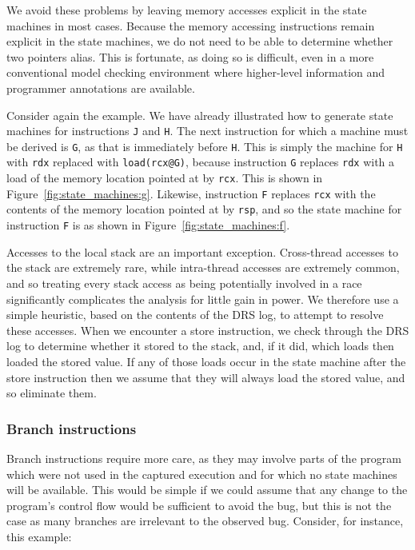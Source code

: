 \documentclass[10pt,letter,twocolumn]{sigplanconf}
\newcommand{\editorial}[1]{}
\newcommand{\needCite}{\editorial{need cite}}
\begin{document}
We avoid these problems by leaving memory accesses explicit in the
state machines in most cases.  Because the memory accessing
instructions remain explicit in the state machines, we do not need to
be able to determine whether two pointers alias.  This is fortunate,
as doing so is difficult, even in a more conventional model checking
environment where higher-level information and programmer annotations
are available\needCite{}.

Consider again the example.  We have already illustrated how to
generate state machines for instructions \verb|J| and \verb|H|.  The
next instruction for which a machine must be derived is \verb|G|, as
that is immediately before \verb|H|.  This is simply the machine for
\verb|H| with \verb|rdx| replaced with \verb|load(rcx@G)|, because
instruction \verb|G| replaces \verb|rdx| with a load of the memory
location pointed at by \verb|rcx|.  This is shown in
Figure~\ref{fig:state_machines:g}.  Likewise, instruction \verb|F|
replaces \verb|rcx| with the contents of the memory location pointed
at by \verb|rsp|, and so the state machine for instruction \verb|F| is
as shown in Figure~\ref{fig:state_machines:f}.

Accesses to the local stack are an important exception.  Cross-thread
accesses to the stack are extremely rare, while intra-thread accesses
are extremely common, and so treating every stack access as being
potentially involved in a race significantly complicates the analysis
for little gain in power.  We therefore use a simple heuristic, based
on the contents of the DRS log, to attempt to resolve these accesses.
When we encounter a store instruction, we check through the DRS log to
determine whether it stored to the stack, and, if it did, which loads
then loaded the stored value.  If any of those loads occur in the
state machine after the store instruction then we assume that they
will always load the stored value, and so eliminate them.

\subsubsection{Branch instructions}
\label{sect:branch_instrs}
Branch instructions require more care, as they may involve parts of
the program which were not used in the captured execution and for
which no state machines will be available.  This would be simple if we
could assume that any change to the program's control flow would be
sufficient to avoid the bug, but this is not the case as many branches
are irrelevant to the observed bug.  Consider, for instance, this
example:
\end{document}
